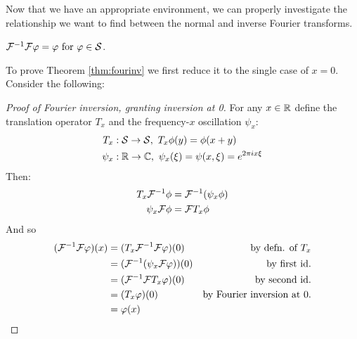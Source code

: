     Now that we have an appropriate environment, we can properly investigate the relationship we want to find between the normal and inverse Fourier transforms.
    \begin{thm}
      \label{thm:fourinv}
      $\mathcal{F}^{-1}\mathcal{F} \varphi = \varphi \text{ for } \varphi\in\mathcal{S}$.
    \end{thm}
    To prove Theorem \ref{thm:fourinv} we first reduce it to the single case of $x=0$.
    Consider the following:
    \begin{proof}[Proof of Fourier inversion, granting inversion at 0]
      For any $x\in\mathbb{R}$ define the translation operator $T_x$ and the frequency-$x$ oscillation $\psi_x$:
      \begin{align*}
        T_x&:\mathcal{S}\rightarrow\mathcal{S},\ T_x\phi(y) = \phi(x+y)\\
        \psi_x&:\mathbb{R}\rightarrow\mathbb{C},\ \psi_x(\xi) = \psi(x,\xi) = e^{2\pi i x \xi}
      \end{align*}
      Then: 
      \begin{align*}
        T_x\mathcal{F}^{-1}\phi &= \mathcal{F}^{-1}(\psi_x\phi)\\
        \psi_x\mathcal{F}\phi &= \mathcal{F} T_x\phi
      \end{align*}
      And so
      \begin{align*}
        (\mathcal{F}^{-1}\mathcal{F}\varphi)(x) &= (T_x\mathcal{F}^{-1}\mathcal{F}\varphi)(0) &\text{by defn. of $T_x$}\\
        &= (\mathcal{F}^{-1}(\psi_x\mathcal{F}\varphi))(0) &\text{by first id.}\\
        &= (\mathcal{F}^{-1}\mathcal{F} T_x\varphi)(0)  &\text{by second id.}\\
        &= (T_x\varphi)(0) &\text{by Fourier inversion at 0.}\\
        &= \varphi(x)&\qedhere
      \end{align*}
    \end{proof}

